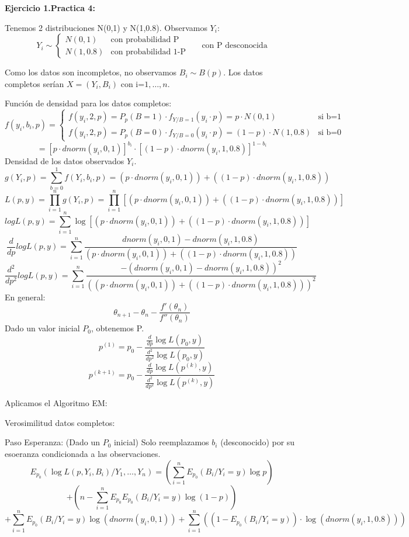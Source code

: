 \textbf{Ejercicio 1.Practica 4:}

Tenemos 2 distribuciones N(0,1) y N(1,0.8). Observamos $Y_i$:
\[
Y_i \sim \left\{
    \begin{matrix}
        N(0,1) & \text{con probabilidad P}\\
        N(1,0.8) & \text{con probabilidad 1-P}
    \end{matrix}
\right.\
\quad
\text{ con P desconocida}
\]

Como los datos son incompletos, no observamos $B_i \sim B(p)$. Los datos completos serían $X=(Y_i,B_i)$ con i=$1,\dots,n$.

Función de densidad para los datos completos:
\[
f(y_i,b_i,p)=\left\{
    \begin{matrix}
        f(y_i,2,p)=P_p(B=1) \cdot f_{Y/B=1}(y_i \cdot p)= p \cdot N(0,1) & \text{si b=1}\\
        f(y_i,2,p)=P_p(B=0) \cdot f_{Y/B=0}(y_i \cdot p)= (1-p) \cdot N(1,0.8) & \text{si b=0}
    \end{matrix}
\right.\
\]
\[
=[p \cdot dnorm(y_i,0,1)]^{b_i} \cdot [(1-p) \cdot dnorm(y_i,1,0.8)]^{1-b_i}
\]
Densidad de los datos observados $Y_i$.
\[
g(Y_i,p)=\sum_{b=0}^{1} f(Y_i,b_i,p)=(p \cdot dnorm(y_i,0,1)) + ((1-p) \cdot dnorm(y_i,1,0.8))
\]
\[
L(p,y)=\prod_{i=1}^{n} g(Y_i,p)=\prod_{i=1}^{n} [(p \cdot dnorm(y_i,0,1)) + ((1-p) \cdot dnorm(y_i,1,0.8))]
\]
\[
log L(p,y)=\sum_{i=1}^{n} \log [(p \cdot dnorm(y_i,0,1)) + ((1-p) \cdot dnorm(y_i,1,0.8))]
\]
\[
\frac{d}{dp} log L(p,y)= \sum_{i=1}^{n} \frac{dnorm(y_i,0,1)-dnorm(y_i,1,0.8)}{(p \cdot dnorm(y_i,0,1)) + ((1-p) \cdot dnorm(y_i,1,0.8))}
\]
\[
\frac{d^2}{dp^2} log L(p,y)= \sum_{i=1}^{n} \frac{-(dnorm(y_i,0,1)-dnorm(y_i,1,0.8))^2}{((p \cdot dnorm(y_i,0,1)) + ((1-p) \cdot dnorm(y_i,1,0.8)))^2}
\]
En general:
\[
\theta_{n+1}-\theta_n
-\frac{f'(\theta_n)}{f''(\theta_n)}\]
\newpage
Dado un valor inicial $P_0$, obtenemos P.
\[
p^{(1)}=p_0-\frac{\frac{d}{dp}\log L(p_0,y)}{\frac{d^2}{dp^2}\log L(p_0,y)}
\]
\[
p^{(k+1)}=p_0-\frac{\frac{d}{dp}\log L(p^{(k)},y)}{\frac{d^2}{dp^2}\log L(p^{(k)},y)}
\]

Aplicamos el Algoritmo EM:

Verosimilitud datos completos:

Paso Esperanza: (Dado un $P_0$ inicial) Solo reemplazamos $b_i$ (desconocido) por su esoeranza condicionada a las observaciones.
\[
E_{p_0}(\log L(p,Y_i,B_i)/Y_1,\dots,Y_n)=(\sum_{i=1}^{n} E_{p_0}(B_i/Y_i=y) \log p)
\]\[
+(n-\sum_{i=1}^{n} E_{p_0} E_{p_0}(B_i/Y_i=y) \log (1-p))
\]\[
+\sum_{i=1}^{n} E_{p_0}(B_i/Y_i=y) \log(dnorm(y_i,0,1))+ \sum_{i=1}^{n} ((1-E_{p_0}(B_i/Y_i=y))\cdot \log(dnorm(y_i,1,0.8)))
\]

